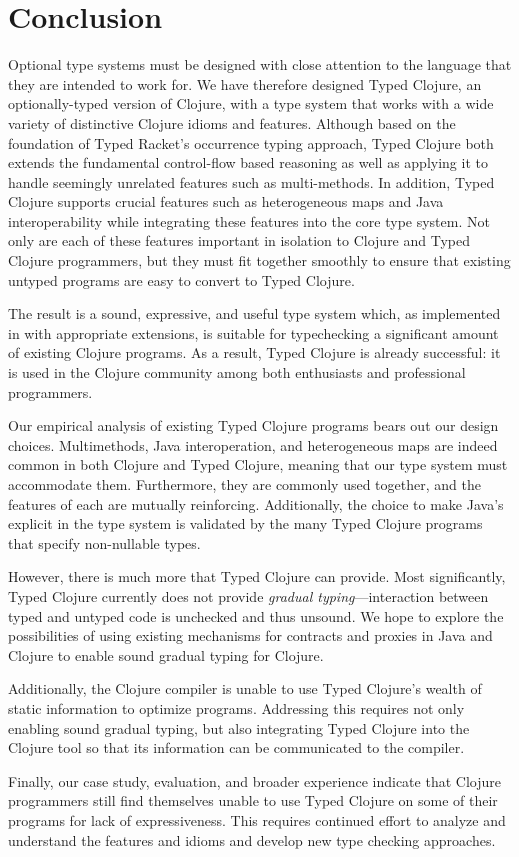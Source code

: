 \chapter{Conclusion}
\label{sec:conclusion}

Optional type systems must be designed with close attention to the
language that they are intended to work for.
We have therefore designed Typed Clojure, an optionally-typed version of
Clojure, with a type system that works with a wide variety of distinctive
Clojure idioms and features. Although based on the foundation of Typed
Racket's occurrence typing approach, Typed Clojure both extends the
fundamental control-flow based reasoning as well as applying it to
handle seemingly unrelated features such as multi-methods. In
addition, Typed Clojure supports crucial features such as
heterogeneous maps and Java interoperability while integrating these
features into the core type system. Not only are each of these
features important in isolation to Clojure and Typed Clojure
programmers, but they must fit together smoothly to ensure that
existing untyped programs are easy to convert to Typed Clojure.

The result is a sound, expressive, and useful type system which, as
implemented in \coretyped with appropriate extensions, is suitable for
typechecking a significant amount of existing Clojure programs.
%
As a result, Typed Clojure is already successful: it is used in
the Clojure community among both enthusiasts and professional
programmers.%

Our empirical analysis of existing Typed Clojure programs bears out
our design choices. Multimethods, Java interoperation, and
heterogeneous maps are indeed common in both Clojure and Typed Clojure,
meaning that our type system must accommodate them. Furthermore, they
are commonly used together, and the features of each are mutually
reinforcing. Additionally, the choice to make Java's 
explicit in the type system is validated by the many Typed Clojure
programs that  specify non-nullable types.


However, there is much more that Typed Clojure can provide. Most
significantly, Typed Clojure currently does not provide \emph{gradual
  typing}---interaction between typed and untyped code is unchecked and
thus unsound. We hope to explore the possibilities of using existing
mechanisms for contracts and proxies in Java and
Clojure to enable sound gradual typing for Clojure.

Additionally, the Clojure compiler is unable to use Typed Clojure's
wealth of static information to optimize programs. Addressing this
requires not only  enabling sound gradual typing, but also
integrating Typed Clojure into the Clojure tool so
that its information can be communicated to the compiler. 

Finally, our case study, evaluation, and broader experience indicate that Clojure
programmers still find themselves unable to use Typed Clojure on some
of their programs for lack of expressiveness. This requires continued
effort to analyze and understand the features and idioms and
develop new type checking approaches.
